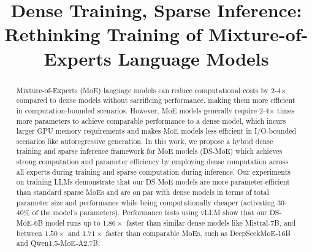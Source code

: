\title{Dense Training, Sparse Inference: Rethinking Training of Mixture-of-Experts Language Models}



\maketitle

\begin{abstract}
Mixture-of-Experts (MoE) language models can reduce computational costs by 2-4$\times$ compared to dense models without sacrificing performance, making them more efficient in computation-bounded scenarios. However, MoE models generally require 2-4$\times$ times more parameters to achieve comparable performance to a dense model, which incurs larger GPU memory requirements and makes MoE models less efficient in I/O-bounded scenarios like autoregressive generation. In this work, we propose a hybrid dense training and sparse inference framework for MoE models (DS-MoE) which achieves strong computation and parameter efficiency by employing dense computation across all experts during training and sparse computation during inference. Our experiments on training LLMs demonstrate that our DS-MoE models are more parameter-efficient than standard sparse MoEs and are on par with dense models in terms of total parameter size and performance while being computationally cheaper (activating 30-40\% of the model's parameters). Performance tests using vLLM show that our DS-MoE-6B model runs up to $1.86\times$ faster than similar dense models like Mistral-7B, and between $1.50\times$ and $1.71\times$ faster than comparable MoEs, such as DeepSeekMoE-16B and Qwen1.5-MoE-A2.7B.
\end{abstract}

